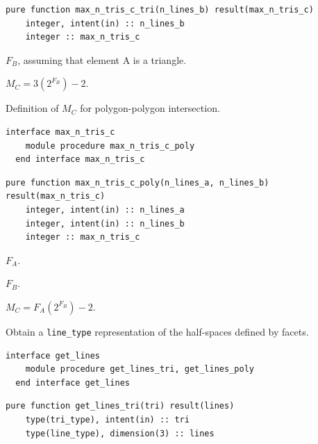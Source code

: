 \documentclass{article}
\begin{document}
\begin{lstlisting}[language=FORTRAN]
  pure function max_n_tris_c_tri(n_lines_b) result(max_n_tris_c)
    integer, intent(in) :: n_lines_b
    integer :: max_n_tris_c
\end{lstlisting} 

\begin{description}[font=\ttfamily\bfseries,leftmargin=2.2\parindent,labelindent=1.7\parindent,noitemsep]
  \item[n\_lines\_b] $F_B$, assuming that element A is a triangle.
  \item[max\_n\_tris\_c] $M_C = 3 \left( 2^{F_B} \right) - 2$.
\end{description}

\noindent Definition of $M_C$ for polygon-polygon intersection.

\begin{lstlisting}[language=FORTRAN]
  interface max_n_tris_c
    module procedure max_n_tris_c_poly
  end interface max_n_tris_c
\end{lstlisting} 

\begin{lstlisting}[language=FORTRAN]
  pure function max_n_tris_c_poly(n_lines_a, n_lines_b) result(max_n_tris_c)
    integer, intent(in) :: n_lines_a
    integer, intent(in) :: n_lines_b
    integer :: max_n_tris_c
\end{lstlisting} 

\begin{description}[font=\ttfamily\bfseries,leftmargin=2.2\parindent,labelindent=1.7\parindent,noitemsep]
  \item[n\_lines\_a] $F_A$.
  \item[n\_lines\_b] $F_B$.
  \item[max\_n\_tris\_c] $M_C = F_A \left( 2^{F_B} \right) - 2$.
\end{description}

\noindent Obtain a \verb+line_type+ representation of the half-spaces defined by
facets.

\begin{lstlisting}[language=FORTRAN]
  interface get_lines
    module procedure get_lines_tri, get_lines_poly
  end interface get_lines
\end{lstlisting} 

\begin{lstlisting}[language=FORTRAN]
  pure function get_lines_tri(tri) result(lines)
    type(tri_type), intent(in) :: tri
    type(line_type), dimension(3) :: lines
\end{lstlisting}
\end{document}
